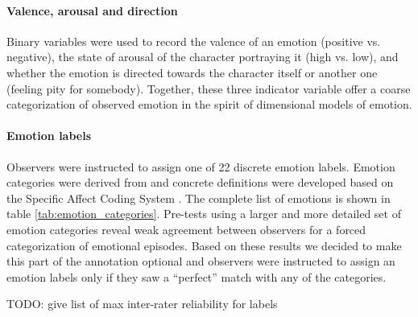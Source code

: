 \paragraph{Valence, arousal and direction}

Binary variables were used to record the valence of an emotion (positive vs.
negative), the state of arousal of the character portraying it (high vs. low),
and whether the emotion is directed towards the character itself or another one
(feeling pity for somebody). Together, these three indicator variable offer a
coarse categorization of observed emotion in the spirit of dimensional models
of emotion.

\paragraph{Emotion labels}

Observers were instructed to assign one of 22 discrete emotion labels. Emotion
categories were derived from \cite{Ort1990} and concrete definitions were
developed based on the Specific Affect Coding System \cite{CG2007}. The
complete list of emotions is shown in table \ref{tab:emotion_categories}.
Pre-tests using a larger and more detailed set of emotion categories reveal
weak agreement between observers for a forced categorization of emotional
episodes. Based on these results we decided to make this part of the annotation
optional and observers were instructed to assign an emotion labels only if they
saw a ``perfect'' match with any of the categories.

TODO: give list of max inter-rater reliability for labels

